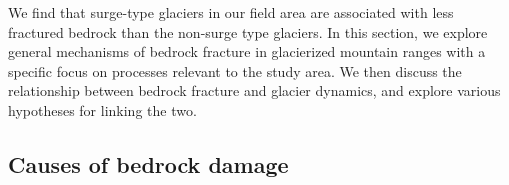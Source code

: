 \documentclass[draft,linenumbers]{agujournal}
\begin{document}

We find that surge-type glaciers in our field area are associated with less fractured bedrock than the non-surge type glaciers. In this section, we explore general mechanisms of bedrock fracture in glacierized mountain ranges with a specific focus on processes relevant to the study area. We then discuss the relationship between bedrock fracture and glacier dynamics, and explore various hypotheses for linking the two.

\subsection{Causes of bedrock damage}
\end{document}
